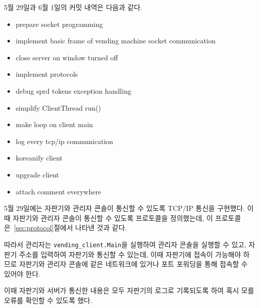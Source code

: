 \documentclass{oblivoir}
\begin{document}
    5월 29일과 6월 1일의 커밋 내역은 다음과 같다.
    \begin{itemize}
        \item prepare socket programming
        \item implement basic frame of vending machine socket communication
        \item close server on window turned off
        \item implement protocols
        \item debug sprd tokens exception handling
        \item simplify ClientThread run()
        \item make loop on client main
        \item log every tcp/ip communication
        \item koreanify client
        \item upgrade client
        \item attach comment everywhere
    \end{itemize}

    5월 29일에는 자판기와 관리자 콘솔이 통신할 수 있도록 TCP/IP 통신을 구현했다.
    이 때 자판기와 관리자 콘솔이 통신할 수 있도록 프로토콜을 정의했는데,
    이 프로토콜은~\ref{sec:protocol}절에서 나타낸 것과 같다.

    따라서 관리자는 \texttt{vending\_client.Main}을 실행하여 관리자 콘솔을 실행할 수 있고,
    자판기 주소를 입력하여 자판기와 통신할 수 있는데,
    이때 자판기에 접속이 가능해야 하므로 자판기와 관리자 콘솔에 같은 네트워크에 있거나
    포트 포워딩을 통해 접속할 수 있어야 한다.

    이때 자판기와 서버가 통신한 내용은 모두 자판기의 로그로 기록되도록 하여
    혹시 모를 오류를 확인할 수 있도록 했다.
\end{document}
